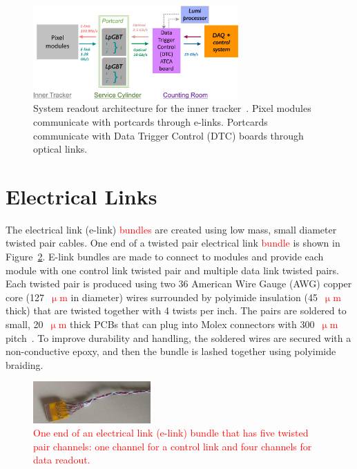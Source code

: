 \documentclass[a4paper,11pt]{article}
\newcommand{\fig}{Figure}
\newcommand{\micron}{\ensuremath{\upmu\mathrm{m}}\xspace}
\newcommand{\red}{\textcolor{red}}
\begin{document}
\begin{figure}[htbp]
\centering
\includegraphics[width=0.70\textwidth,origin=c]{../figures/IT_System_Readout_2-crop.pdf}
\caption{
\label{fig:readout}
System readout architecture for the inner tracker~\cite{ref:orfanelli}. Pixel modules communicate with portcards through e-links. Portcards communicate with Data Trigger Control (DTC) boards through optical links.
}
\end{figure}

\section{Electrical Links}
\label{sec:electrical}


The electrical link (e-link) \red{bundles} are created using low mass, small diameter twisted pair cables.
One end of a twisted pair electrical link \red{bundle} is shown in \fig~\ref{fig:elink}.
E-link bundles are made to connect to modules and provide each module with one control link twisted pair and multiple data link twisted pairs.
Each twisted pair is produced using two 36 American Wire Gauge (AWG) copper core (127~\red{\micron} in diameter) wires surrounded by polyimide insulation (45~\red{\micron} thick) that are twisted together with 4 twists per inch.
The pairs are soldered to small, 20~\red{\micron} thick PCBs that can plug into Molex connectors with 300~\red{\micron} pitch~\cite{ref:molex45}.
To improve durability and handling, the soldered wires are secured with a non-conductive epoxy, and then the bundle is lashed together using polyimide braiding.

\begin{figure}[htbp]
\centering
\includegraphics[width=0.4\textwidth,origin=c]{../figures/e-link-1.jpg}
\caption{
\label{fig:elink}
\red{One end of an electrical link (e-link) bundle that has five twisted pair channels: one channel for a control link and four channels for data readout.}
}
\end{figure}
\end{document}
